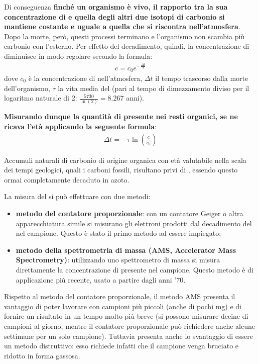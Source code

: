 \documentclass[a4paper,11pt,twoside,openany]{book}
\theoremstyle{definition}
\theoremstyle{plain}
\theoremstyle{plain}
\theoremstyle{definition}
\begin{document}
Di conseguenza \textbf{finché un organismo è vivo, il rapporto tra la sua concentrazione di  e quella degli altri due isotopi di carbonio si mantiene costante e uguale a quella che si riscontra nell'atmosfera}. Dopo la morte, però, questi processi terminano e l'organismo non scambia più carbonio con l'esterno. Per effetto del decadimento, quindi, la concentrazione di  diminuisce in modo regolare secondo la formula:
\begin{equation}\begin{split}
c=c_0e^{-\frac{\Delta t}{\tau}}
\end{split}\end{equation}
dove $c_0$ è la concentrazione di  nell'atmosfera, $\Delta t$ il tempo trascorso dalla morte dell'organismo, $\tau$ la vita media del  (pari al tempo di dimezzamento diviso per il logaritmo naturale di 2: $\frac{5730}{\ln(2)} = \si{8.267}$ anni).

\textbf{Misurando dunque la quantità di  presente nei resti organici, se ne ricava l'età applicando la seguente formula}:
\begin{equation}\begin{split}
\Delta t=-\tau\ln{\left(\frac{c}{c_0}\right)}
\end{split}\end{equation}

Accumuli naturali di carbonio di origine organica con età valutabile nella scala dei tempi geologici, quali i carboni fossili, risultano privi di , essendo questo ormai completamente decaduto in azoto.

La misura del  si può effettuare con due metodi:
\begin{itemize}
\item \textbf{metodo del contatore proporzionale}: con un contatore Geiger o altra apparecchiatura simile si misurano gli elettroni prodotti dal decadimento del  nel campione. Questo è stato il primo metodo ad essere impiegato;
\item \textbf{metodo della spettrometria di massa (AMS, Accelerator Mass Spectrometry)}: utilizzando uno spettrometro di massa si misura direttamente la concentrazione di  presente nel campione. Questo metodo è di applicazione più recente, usato a partire dagli anni '70.
\end{itemize}

Rispetto al metodo del contatore proporzionale, il metodo AMS presenta il vantaggio di poter lavorare con campioni più piccoli (anche di pochi mg) e di fornire un risultato in un tempo molto più breve (si possono misurare decine di campioni al giorno, mentre il contatore proporzionale può richiedere anche alcune settimane per un solo campione). Tuttavia presenta anche lo svantaggio di essere un metodo distruttivo: esso richiede infatti che il campione venga bruciato e ridotto in forma gassosa.
\end{document}
